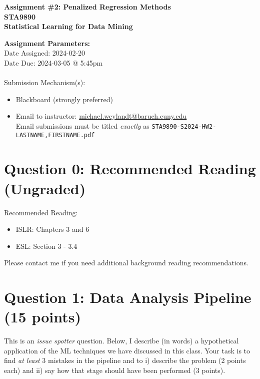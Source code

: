 \documentclass[10pt]{article}
\begin{document}
\begin{center}
    {\Large \bf Assignment \#2: Penalized Regression Methods \\ STA9890 \\ Statistical Learning for Data Mining}
\end{center}

{\bf Assignment Parameters:} \\
\phantom{abc}Date Assigned: 2024-02-20\\
\phantom{abc}Date Due: 2024-03-05 @ 5:45pm \\
~\\
\phantom{abc}Submission Mechanism(s):
\begin{itemize}
    \item Blackboard (strongly preferred)
    \item Email to instructor: \href{mailto:michael.weylandt@baruch.cuny.edu}{michael.weylandt@baruch.cuny.edu} \\ 
    {\small Email submissions must be titled \emph{exactly} as \texttt{STA9890-S2024-HW2-LASTNAME,FIRSTNAME.pdf}}
\end{itemize}

\section*{Question 0: Recommended Reading (Ungraded)}
Recommended Reading:
\begin{itemize}
    \item ISLR: Chapters 3 and 6
    \item ESL: Section 3 - 3.4
\end{itemize}
Please contact me if you need additional background reading recommendations. 

\section*{Question 1: Data Analysis Pipeline (15 points)}

This is an \emph{issue spotter} question. Below, I describe (in words) a hypothetical application of the ML techniques we have discussed in this class. Your task is to find \emph{at least} 3 mistakes in the pipeline and to i) describe the problem (2 points each) and ii) say how that stage should have been performed (3 points).  
\end{document}
